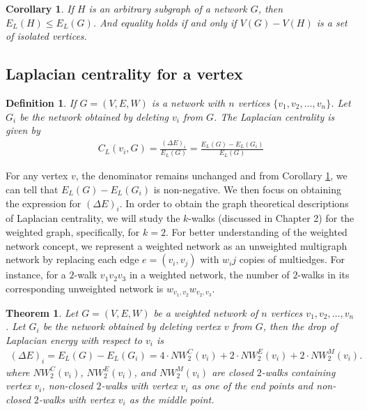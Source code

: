 \documentclass[10pt,a4paper]{article}
\newtheorem{thm}{Theorem}
\newtheorem{defn}{Definition}
\newtheorem{cor}{Corollary}
\begin{document}
\begin{cor}
	If $H$ is an arbitrary subgraph of a network $G$, then $E_L(H) \leq E_L(G)$. And equality holds if and only if $V(G)-V(H)$ is a set of isolated vertices.
	\label{cor:1}
\end{cor}

\subsection{Laplacian centrality for a vertex}
\begin{defn}
	If $G=(V,E,W)$ is a network with $n$ vertices $\{v_1,v_2,\ldots, v_n\}$. Let $G_i$ be the network obtained by deleting $v_i$ from $G$. The Laplacian centrality is given by
	\begin{eqnarray}
	C_L(v_i,G) = \frac{(\Delta E)_i}{E_L(G)} = \frac{E_L(G) - E_L(G_i)}{E_L(G)}
	\end{eqnarray} 
	\label{lapcentrality-undirected}
\end{defn}
For any vertex $v$, the denominator remains unchanged and from Corollary \ref{cor:1}, we can tell that $E_L(G) - E_L(G_i)$ is non-negative. We then focus on obtaining the expression for $(\Delta E)_i$. In order to obtain the graph theoretical descriptions of Laplacian centrality, we will study the $k$-walks (discussed in Chapter 2) for the weighted graph, specifically, for $k=2$. For better understanding of the weighted network concept, we represent a weighted network as an unweighted multigraph network by replacing each edge $e=(v_i,v_j)$ with $w_ij$ copies of multiedges. For instance, for a $2$-walk $v_1v_2v_3$ in a weighted network, the number of $2$-walks in its corresponding unweighted network is  $w_{v_1,v_2}w_{v_2,v_3}$. 

\begin{thm}
	Let $G=(V,E,W)$ be a weighted network of $n$ vertices ${v_1,v_2,\ldots,v_n}$. Let $G_i$ be the network obtained by deleting vertex $v$ from $G$, then the drop of Laplacian energy with respect to $v_i$ is
	\begin{eqnarray}
	(\Delta E)_i = E_L(G) -E_L(G_i) = 4 \cdot NW_2^C (v_i) + 2 \cdot NW_2^E (v_i) + 2 \cdot NW_2^M (v_i).
	\label{energychange}
	\end{eqnarray}
	where
	$NW_{2} ^C(v_i)$, $NW_{2} ^E(v_i)$, and $NW_{2} ^M(v_i)$ are closed $2$-walks containing vertex $v_i$, non-closed $2$-walks with vertex $v_i$ as one of the end points and non-closed $2$-walks with vertex $v_i$ as the middle point\citep{qi2012laplacian}.
	\label{thm2}
\end{thm}
\end{document}
